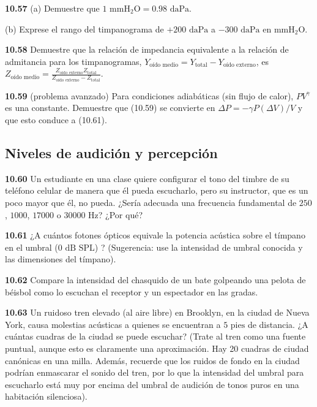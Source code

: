\documentclass[12pt]{book}
\begin{document}
\noindent \textbf{10.57} (a) Demuestre que $1\text{ mmH}_2\text{O} = 0.98\text{ daPa}$.

(b) Exprese el rango del timpanograma de $+200\text{ daPa}$ a $-300\text{ daPa}$ en $\text{mmH}_2\text{O}$.

\noindent \textbf{10.58} Demuestre que la relación de impedancia equivalente a la relación de admitancia para los timpanogramas, $Y_{\text{oído medio}} = Y_{\text{total}} - Y_{\text{oído externo}}$, es $Z_{\text{oído medio}} = \frac{Z_{\text{oído externo}} Z_{\text{total}}}{Z_{\text{oído externo}} - Z_{\text{total}}}$.

\noindent \textbf{10.59} (problema avanzado) Para condiciones adiabáticas (sin flujo de calor), $PV^\gamma$ es una constante. Demuestre que (10.59) se convierte en $\Delta P = -\gamma P(\Delta V)/V$ y que esto conduce a (10.61).

\subsection*{Niveles de audición y percepción}

\noindent \textbf{10.60} Un estudiante en una clase quiere configurar el tono del timbre de su teléfono celular de manera que él pueda escucharlo, pero su instructor, que es un poco mayor que él, no pueda. ¿Sería adecuada una frecuencia fundamental de $250$, $1000$, $17000$ o $30000\text{ Hz}$? ¿Por qué?

\noindent \textbf{10.61} ¿A cuántos fotones ópticos equivale la potencia acústica sobre el tímpano en el umbral ($0\text{ dB SPL}$) \cite{52}? (Sugerencia: use la intensidad de umbral conocida y las dimensiones del tímpano).

\noindent \textbf{10.62} Compare la intensidad del chasquido de un bate golpeando una pelota de béisbol como lo escuchan el receptor y un espectador en las gradas.

\noindent \textbf{10.63} Un ruidoso tren elevado (al aire libre) en Brooklyn, en la ciudad de Nueva York, causa molestias acústicas a quienes se encuentran a $5\text{ pies}$ de distancia. ¿A cuántas cuadras de la ciudad se puede escuchar? (Trate al tren como una fuente puntual, aunque esto es claramente una aproximación. Hay 20 cuadras de ciudad canónicas en una milla. Además, recuerde que los ruidos de fondo en la ciudad podrían enmascarar el sonido del tren, por lo que la intensidad del umbral para escucharlo está muy por encima del umbral de audición de tonos puros en una habitación silenciosa).
\end{document}
